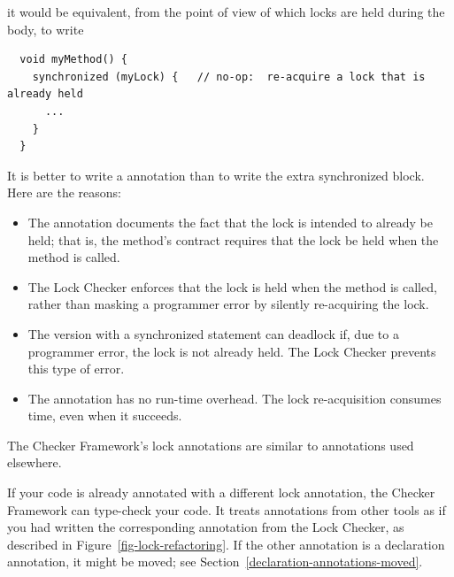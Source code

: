 \noindent
it would be equivalent, from the point of view of which locks are held
during the body, to write

\begin{Verbatim}
  void myMethod() {
    synchronized (myLock) {   // no-op:  re-acquire a lock that is already held
      ...
    }
  }
\end{Verbatim}


It is better to write a  annotation than to write the
extra synchronized block.  Here are the reasons:

\begin{itemize}
\item
  The annotation documents the fact that the lock is intended to already be
  held; that is, the method's contract requires that the lock be held when
  the method is called.
\item
  The Lock Checker enforces that the lock is held when the method is
  called, rather than masking a programmer error by silently re-acquiring
  the lock.
\item
  The version with a synchronized statement can deadlock if, due to a programmer error,
  the lock is not already held.  The Lock Checker prevents this type of
  error.
\item
  The annotation has no run-time overhead.  The lock re-acquisition
  consumes time, even when it succeeds.
\end{itemize}



The Checker Framework's lock annotations are similar to annotations used
elsewhere.

If your code is already annotated with a different lock
annotation, the Checker Framework can type-check your code.
It treats annotations from other tools
as if you had written the corresponding annotation from the
Lock Checker, as described in Figure~\ref{fig-lock-refactoring}.
If the other annotation is a declaration annotation, it might be moved; see
Section~\ref{declaration-annotations-moved}.


